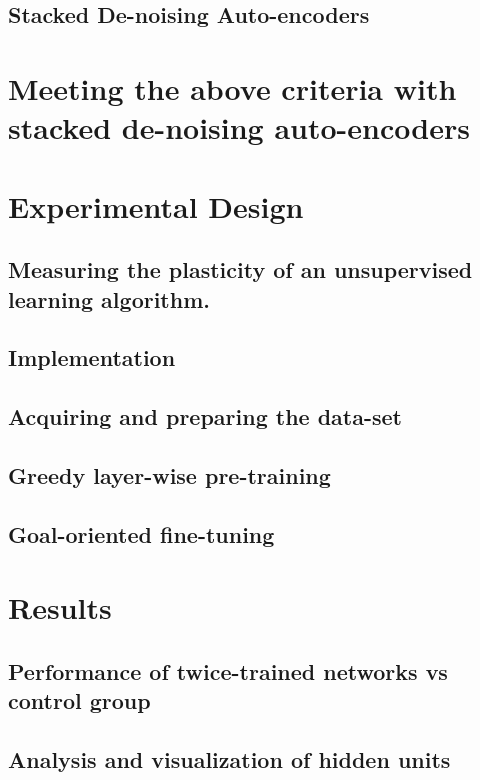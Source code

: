 \documentclass[12pt]{article}
\begin{document}
	\subsection{Stacked De-noising Auto-encoders}
	
\section{Meeting the above criteria with stacked de-noising auto-encoders}

\section{Experimental Design}

	\subsection{Measuring the plasticity of an unsupervised learning algorithm.}
	
	\subsection{Implementation}
		
	\subsection{Acquiring and preparing the data-set}
	
	\subsection{Greedy layer-wise pre-training}
	
	\subsection{Goal-oriented fine-tuning}
	
\section{Results}

	\subsection{Performance of twice-trained networks vs control group}

	\subsection{Analysis and visualization of hidden units}
	
\end{document}
